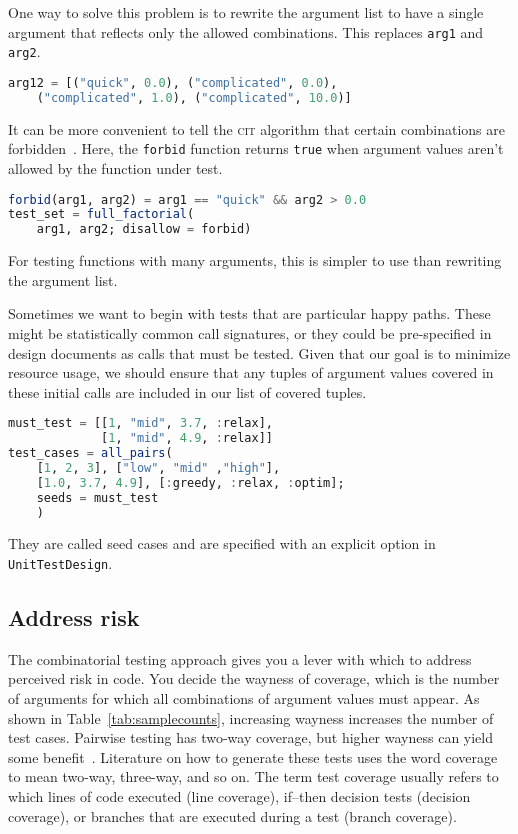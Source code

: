 \documentclass{juliacon}
\newcommand{\utd}{\texttt{UnitTestDesign}\xspace}
\newcommand{\cit}{\textsc{cit}\xspace}
\begin{document}
\vskip 6pt
One way to solve this problem is to rewrite the argument list to have a single argument that reflects only the allowed combinations. This replaces \verb|arg1| and \verb|arg2|.
\begin{lstlisting}[language=Julia]
arg12 = [("quick", 0.0), ("complicated", 0.0),
    ("complicated", 1.0), ("complicated", 10.0)]
\end{lstlisting}
It can be more convenient to tell the \cit algorithm that certain combinations are forbidden~\cite{Petke2015-ex,Grindal2006-vy}. Here, the \verb|forbid| function returns \verb|true| when argument values aren't allowed by the function under test.
\begin{lstlisting}[language=Julia]
forbid(arg1, arg2) = arg1 == "quick" && arg2 > 0.0
test_set = full_factorial(
    arg1, arg2; disallow = forbid)
\end{lstlisting}
For testing functions with many arguments, this is simpler to use than rewriting the argument list.

\vskip 6pt
Sometimes we want to begin with tests that are particular happy paths. These might be statistically common call signatures, or they could be pre-specified in design documents as calls that must be tested. Given that our goal is to minimize resource usage, we should ensure that any tuples of argument values covered in these initial calls are included in our list of covered tuples.
\begin{lstlisting}[language=Julia]
must_test = [[1, "mid", 3.7, :relax],
             [1, "mid", 4.9, :relax]]
test_cases = all_pairs(
    [1, 2, 3], ["low", "mid" ,"high"],
    [1.0, 3.7, 4.9], [:greedy, :relax, :optim];
    seeds = must_test
    )
\end{lstlisting}
They are called seed cases and are specified with an explicit option in \utd.

\subsection{Address risk}

The combinatorial testing approach gives you a lever with which to address perceived risk in code. You decide the wayness of coverage, which is the number of arguments for which all combinations of argument values must appear. As shown in Table~\ref{tab:samplecounts}, increasing wayness increases the number of test cases. Pairwise testing has two-way coverage, but higher wayness can yield some benefit~\cite{Petke2015-ex}. Literature on how to generate these tests uses the word coverage to mean two-way, three-way, and so on. The term test coverage usually refers to which lines of code executed (line coverage), if--then decision tests (decision coverage), or branches that are executed during a test (branch coverage).
\end{document}
